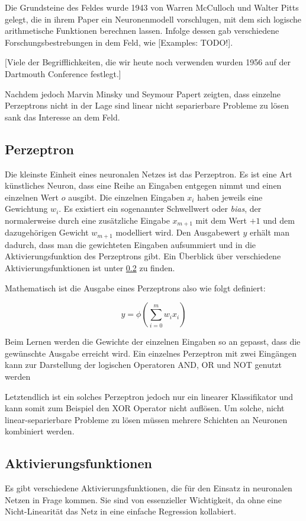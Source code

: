Die Grundsteine des Feldes wurde 1943 von Warren McCulloch und Walter Pitts gelegt, 
die in ihrem Paper ein Neuronenmodell vorschlugen, mit dem sich logische arithmetische Funktionen berechnen lassen. 
Infolge dessen gab verschiedene Forschungsbestrebungen in dem Feld, wie [Examples: TODO!].

[Viele der Begrifflichkeiten, die wir heute noch verwenden wurden 1956 auf der Dartmouth Conference festlegt.]

Nachdem jedoch Marvin Minsky und Seymour Papert zeigten, dass einzelne Perzeptrons nicht in der Lage sind linear nicht separierbare Probleme zu lösen sank das Interesse an dem Feld.

\subsection{Perzeptron}
Die kleinste Einheit eines neuronalen Netzes ist das Perzeptron.
Es ist eine Art künstliches Neuron, dass eine Reihe an Eingaben entgegen nimmt und einen einzelnen Wert $o$ ausgibt.
Die einzelnen Eingaben $x_i$ haben jeweils eine Gewichtung $w_i$.
Es existiert ein sogenannter Schwellwert oder \textit{bias}, der normalerweise 
durch eine zusätzliche Eingabe $x_{m+1}$ mit dem Wert $+1$ und dem dazugehörigen Gewicht $w_{m+1}$ modelliert wird.
Den Ausgabewert $y$ erhält man dadurch, dass man die gewichteten Eingaben aufsummiert und in die Aktivierungsfunktion des Perzeptrons gibt.
Ein Überblick über verschiedene Aktivierungsfunktionen ist unter \ref{activationfuncs} zu finden.

Mathematisch ist die Ausgabe eines Perzeptrons also wie folgt definiert:

\begin{equation}
	y = \phi ( \sum_{i= 0}^{m} w_i x_i)
\end{equation}

Beim Lernen werden die Gewichte der einzelnen Eingaben so an gepasst, dass die gewünschte Ausgabe erreicht wird.
Ein einzelnes Perzeptron mit zwei Eingängen kann zur Darstellung der logischen Operatoren AND, OR und NOT genutzt werden

Letztendlich ist ein solches Perzeptron jedoch nur ein linearer Klassifikator und kann somit zum Beispiel den XOR Operator nicht auflösen.
Um solche, nicht linear-separierbare Probleme zu lösen müssen mehrere Schichten an Neuronen kombiniert werden.

\subsection{Aktivierungsfunktionen}
\label{activationfuncs}
Es gibt verschiedene Aktivierungsfunktionen, die für den Einsatz in neuronalen Netzen in Frage kommen.
Sie sind von essenzieller Wichtigkeit, da ohne eine Nicht-Linearität das Netz in eine einfache Regression kollabiert.

